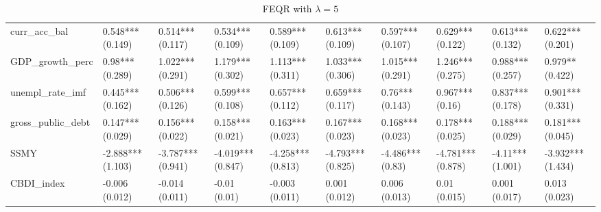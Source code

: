 \begin{table}[H]
\begin{subtable}[c]{\textwidth}
{\begin{tabular}{llllllllll}
  curr\_acc\_bal & 0.548*** (0.149) & 0.514*** (0.117) & 0.534*** (0.109) & 0.589*** (0.109) & 0.613*** (0.109) & 0.597*** (0.107) & 0.629*** (0.122) & 0.613*** (0.132) & 0.622*** (0.201) \\ 
  GDP\_growth\_perc & 0.98*** (0.289) & 1.022*** (0.291) & 1.179*** (0.302) & 1.113*** (0.311) & 1.033*** (0.306) & 1.015*** (0.291) & 1.246*** (0.275) & 0.988*** (0.257) & 0.979** (0.422) \\ 
  unempl\_rate\_imf & 0.445*** (0.162) & 0.506*** (0.126) & 0.599*** (0.108) & 0.657*** (0.112) & 0.659*** (0.117) & 0.76*** (0.143) & 0.967*** (0.16) & 0.837*** (0.178) & 0.901*** (0.331) \\ 
  gross\_public\_debt & 0.147*** (0.029) & 0.156*** (0.022) & 0.158*** (0.021) & 0.163*** (0.023) & 0.167*** (0.023) & 0.168*** (0.023) & 0.178*** (0.025) & 0.188*** (0.029) & 0.181*** (0.045) \\ 
  SSMY & -2.888*** (1.103) & -3.787*** (0.941) & -4.019*** (0.847) & -4.258*** (0.813) & -4.793*** (0.825) & -4.486*** (0.83) & -4.781*** (0.878) & -4.11*** (1.001) & -3.932*** (1.434) \\ 
  CBDI\_index & -0.006 (0.012) & -0.014 (0.011) & -0.01 (0.01) & -0.003 (0.011) & 0.001 (0.012) & 0.006 (0.013) & 0.01 (0.015) & 0.001 (0.017) & 0.013 (0.023) \\ 
   \bottomrule
\end{tabular}}
\end{subtable}
\\
\begin{subtable}[c]{\textwidth}
\caption{FEQR with $\lambda = 5$}
\centering
{}
\end{subtable}
\end{table}
